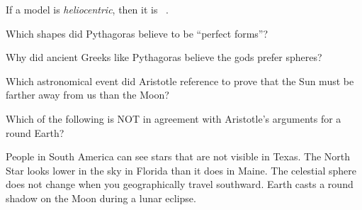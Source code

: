 \documentclass[addpoints]{exam}
\begin{document}
\begin{questions}
\question
If a model is \textit{heliocentric}, then it is \fillin\ .




\question
Which shapes did Pythagoras believe to be ``perfect forms''?


\question
Why did ancient Greeks like Pythagoras believe the gods prefer spheres?


\question
Which astronomical event did Aristotle reference to prove that the Sun must be farther away from us than the Moon?


\question
Which of the following is NOT in agreement with Aristotle's arguments for a round Earth?

\begin{choices}
    \choice People in South America can see stars that are not visible in Texas.
    \choice The North Star looks lower in the sky in Florida than it does in Maine.
    \correctchoice The celestial sphere does not change when you geographically travel southward. 
    \choice Earth casts a round shadow on the Moon during a lunar eclipse.
\end{choices}




\end{questions}
\end{document}
